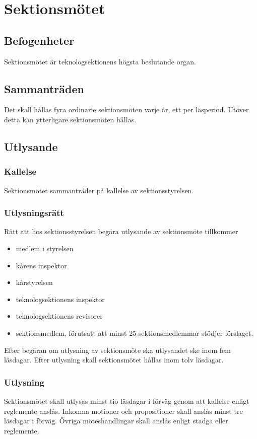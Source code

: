 \section{Sektionsmötet}

\subsection{Befogenheter}
Sektionsmötet är teknologsektionens högsta beslutande organ.

\subsection{Sammanträden}
Det skall hållas fyra ordinarie sektionsmöten varje år, ett per läsperiod. 
Utöver detta kan ytterligare sektionsmöten hållas.

\subsection{Utlysande}
\label{sec:utlysande}

\subsubsection{Kallelse}
Sektionsmötet sammanträder på kallelse av sektionsstyrelsen.

\subsubsection{Utlysningsrätt}
Rätt att hos sektionsstyrelsen begära utlysande av sektionsmöte tillkommer

\begin{itemize}
	\item medlem i styrelsen
	\item kårens inspektor
	\item kårstyrelsen
	\item teknologsektionens inspektor
	\item teknologsektionens revisorer
	\item sektionsmedlem, förutsatt att minst 25 sektionsmedlemmar stödjer förslaget.
\end{itemize}

Efter begäran om utlysning av sektionsmöte ska utlysandet ske inom fem läsdagar. 
Efter utlysning skall sektionsmötet hållas inom tolv läsdagar.

\subsubsection{Utlysning}
Sektionsmötet skall utlysas minst tio läsdagar i förväg genom att kallelse enligt reglemente anslås. Inkomna motioner och propositioner skall anslås minst tre läsdagar i förväg. Övriga möteshandlingar skall anslås enligt stadga eller reglemente. 

